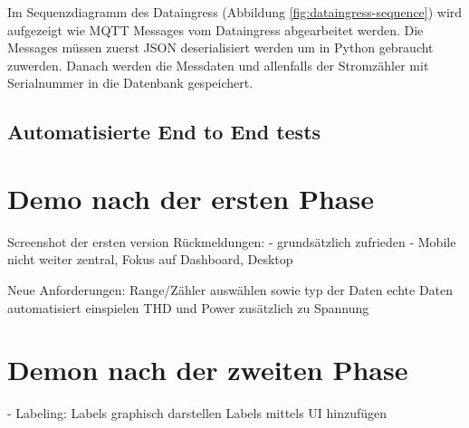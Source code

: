 Im Sequenzdiagramm des Dataingress (Abbildung \ref{fig:dataingress-sequence}) wird aufgezeigt
wie \ac{MQTT} Messages vom Dataingress abgearbeitet werden.
Die Messages müssen zuerst \ac{JSON} deserialisiert werden um in Python
gebraucht zuwerden. Danach werden die Messdaten und allenfalls der
Stromzähler mit Serialnummer in die Datenbank gespeichert.

\subsection{Automatisierte End to End tests}



\section{Demo nach der ersten Phase}
Screenshot der ersten version
Rückmeldungen:
- grundsätzlich zufrieden
- Mobile nicht weiter zentral, Fokus auf Dashboard, Desktop

Neue Anforderungen:
Range/Zähler auswählen sowie typ der Daten
echte Daten automatisiert einspielen
THD und Power zusätzlich zu Spannung

\section{Demon nach der zweiten Phase}
- Labeling:
Labels graphisch darstellen
Labels mittels UI hinzufügen
